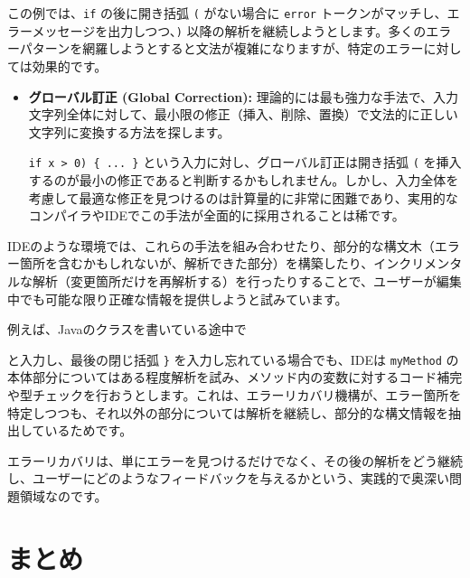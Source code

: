 この例では、\texttt{if} の後に開き括弧 \texttt{(} がない場合に
\texttt{error}
トークンがマッチし、エラーメッセージを出力しつつ、\texttt{)}
以降の解析を継続しようとします。多くのエラーパターンを網羅しようとすると文法が複雑になりますが、特定のエラーに対しては効果的です。

\begin{itemize}
\item
  \textbf{グローバル訂正 (Global Correction):}
  理論的には最も強力な手法で、入力文字列全体に対して、最小限の修正（挿入、削除、置換）で文法的に正しい文字列に変換する方法を探します。

  \texttt{if\ x\ \textgreater{}\ 0)\ \{\ ...\ \}}
  という入力に対し、グローバル訂正は開き括弧 \texttt{(}
  を挿入するのが最小の修正であると判断するかもしれません。しかし、入力全体を考慮して最適な修正を見つけるのは計算量的に非常に困難であり、実用的なコンパイラやIDEでこの手法が全面的に採用されることは稀です。
\end{itemize}

IDEのような環境では、これらの手法を組み合わせたり、部分的な構文木（エラー箇所を含むかもしれないが、解析できた部分）を構築したり、インクリメンタルな解析（変更箇所だけを再解析する）を行ったりすることで、ユーザーが編集中でも可能な限り正確な情報を提供しようと試みています。

例えば、Javaのクラスを書いている途中で

\begin{Shaded}
\begin{Highlighting}[]
    \NormalTok{() \{ }
\NormalTok{  \}}
\end{Highlighting}
\end{Shaded}

と入力し、最後の閉じ括弧 \texttt{\}} を入力し忘れている場合でも、IDEは
\texttt{myMethod}
の本体部分についてはある程度解析を試み、メソッド内の変数に対するコード補完や型チェックを行おうとします。これは、エラーリカバリ機構が、エラー箇所を特定しつつも、それ以外の部分については解析を継続し、部分的な構文情報を抽出しているためです。

エラーリカバリは、単にエラーを見つけるだけでなく、その後の解析をどう継続し、ユーザーにどのようなフィードバックを与えるかという、実践的で奥深い問題領域なのです。

\hypertarget{chapter7-ux307eux3068ux3081}{%
\section{まとめ}\label{chapter7-ux307eux3068ux3081}}

